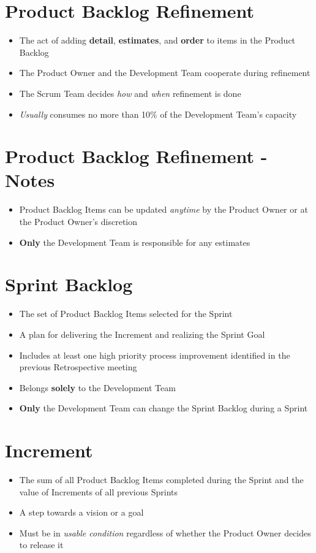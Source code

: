 \documentclass[a4paper,11pt,twocolumn]{article}
\begin{document}
\section*{Product Backlog Refinement}
\begin{itemize}
	\item The act of adding \textbf{detail}, \textbf{estimates}, and \textbf{order} to items in the Product Backlog
	\item The Product Owner and the Development Team cooperate during refinement
	\item The Scrum Team decides \textit{how} and \textit{when} refinement is done
	\item \textit{Usually} consumes no more than 10\% of the Development Team's capacity
\end{itemize}

\section*{Product Backlog Refinement - Notes}
\begin{itemize}
	\item Product Backlog Items can be updated \textit{anytime} by the Product Owner or at the Product Owner's discretion
	\item \textbf{Only} the Development Team is responsible for any estimates
\end{itemize}

\section*{Sprint Backlog}
\begin{itemize}
	\item The set of Product Backlog Items selected for the Sprint
	\item A plan for delivering the Increment and realizing the Sprint Goal
	\item Includes at least one high priority process improvement identified in the previous Retrospective meeting
	\item Belongs \textbf{solely} to the Development Team
	\item \textbf{Only} the Development Team can change the Sprint Backlog during a Sprint
\end{itemize}

\section*{Increment}
\begin{itemize}
	\item The sum of all Product Backlog Items completed during the Sprint and the value of Increments of all previous Sprints
	\item A step towards a vision or a goal
	\item Must be in \textit{usable condition} regardless of whether the Product Owner decides to release it
\end{itemize}
\end{document}
